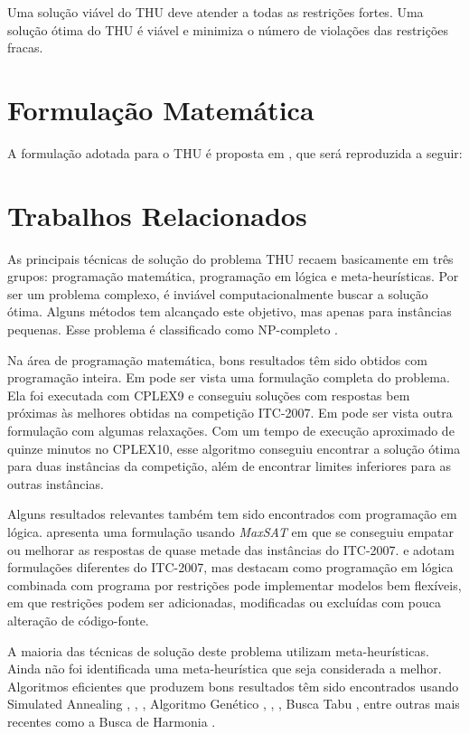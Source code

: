 \documentclass[11pt]{article}
\begin{document}
Uma solução viável do THU deve atender a todas as restrições fortes. Uma solução ótima do THU é viável e minimiza o número de violações das restrições fracas.

\section{Formulação Matemática}
\label{sec:formulacao_matematica}

A formulação adotada para o THU é proposta em \cite{ref}, que será reproduzida a seguir:

\section{Trabalhos Relacionados}
\label{sec:trabalhos_relacionados}

As principais técnicas de solução do problema THU recaem basicamente em três grupos: programação matemática, programação em lógica e meta-heurísticas. Por ser um problema complexo, é inviável computacionalmente buscar a solução ótima. Alguns métodos tem alcançado este objetivo, mas apenas para instâncias pequenas. Esse problema é classificado como NP-completo \cite{Schaerf95asurvey}.

Na área de programação matemática, bons resultados têm sido obtidos com programação inteira. Em \cite{lach_lubbecke} pode ser vista uma formulação completa do problema. Ela foi executada com CPLEX9 e conseguiu soluções com respostas bem próximas às melhores obtidas na competição ITC-2007. Em \cite{Burke_abranch-andcut} pode ser vista outra formulação com algumas relaxações. Com um tempo de execução aproximado de quinze minutos no CPLEX10, esse algoritmo conseguiu encontrar a solução ótima para duas instâncias da competição, além de encontrar limites inferiores para as outras instâncias.

Alguns resultados relevantes também tem sido encontrados com programação em lógica. \cite{springerlink:10.1007/s10479-012-1081-x} apresenta uma formulação usando \textit{MaxSAT} em que se conseguiu empatar ou melhorar as respostas de quase metade das instâncias do ITC-2007. \cite{Gueret95buildinguniversity} e \cite{Goltz99universitytimetabling} adotam formulações diferentes do ITC-2007, mas destacam como programação em lógica combinada com programa por restrições pode implementar modelos bem flexíveis, em que restrições podem ser adicionadas, modificadas ou excluídas com pouca alteração de código-fonte.

A maioria das técnicas de solução deste problema utilizam meta-heurísticas. Ainda não foi identificada uma meta-heurística que seja considerada a melhor.  Algoritmos eficientes que produzem bons resultados têm sido encontrados usando Simulated Annealing \cite{3-phaseSA}, \cite{sa_hyper_heuristica}, \cite{Elmohamed98acomparison}, Algoritmo Genético \cite{Erben95agenetic}, \cite{suyanto}, \cite{Kanoh:2008:KGA:1460198.1460201}, Busca Tabu \cite{elloumi2008}, entre outras mais recentes como a Busca de Harmonia \cite{albetar_harmony}.
\end{document}
